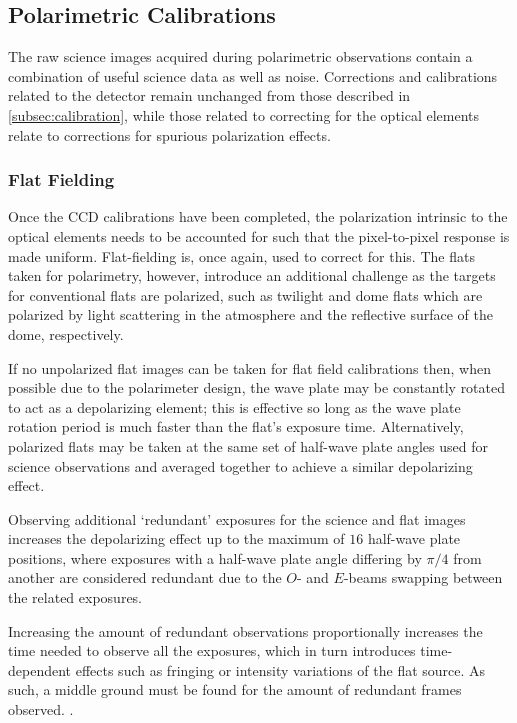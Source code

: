 \subsection{Polarimetric Calibrations} \label{subsec:pol_cal}

The raw science images acquired during polarimetric observations contain a combination of useful science data as well as noise. Corrections and calibrations related to the detector remain unchanged from those described in \autoref{subsec:calibration}, while those related to correcting for the optical elements relate to corrections for spurious polarization effects.

\subsubsection{Flat Fielding} \label{subsubsec:pol_flat}

Once the \gls{CCD} calibrations have been completed, the polarization intrinsic to the optical elements needs to be accounted for such that the pixel-to-pixel response is made uniform. Flat-fielding is, once again, used to correct for this. The flats taken for polarimetry, however, introduce an additional challenge as the targets for conventional flats are polarized, such as twilight and dome flats which are polarized by light scattering in the atmosphere and the reflective surface of the dome, respectively.

If no unpolarized flat images can be taken for flat field calibrations then, when possible due to the polarimeter design, the wave plate may be constantly rotated to act as a depolarizing element; this is effective so long as the wave plate rotation period is much faster than the flat's exposure time. Alternatively, polarized flats may be taken at the same set of half-wave plate angles used for science observations and averaged together to achieve a similar depolarizing effect.

Observing additional `redundant' exposures for the science and flat images increases the depolarizing effect up to the maximum of $16$ half-wave plate positions, where exposures with a half-wave plate angle differing by $\pi / 4$ from another are considered redundant due to the $O$- and $E$-beams swapping between the related exposures.

Increasing the amount of redundant observations proportionally increases the time needed to observe all the exposures, which in turn introduces time-dependent effects such as fringing or intensity variations of the flat source. As such, a middle ground must be found for the amount of redundant frames observed. \citep{polarimetry_error, pol_optimize}.

